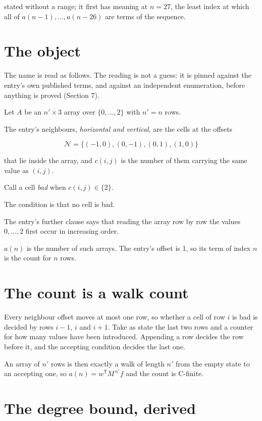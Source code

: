 \documentclass[11pt]{article}
\theoremstyle{definition}
\begin{document}
stated without a range; it first has meaning at $n = 27$, the least index at which all of $a(n-1),\dots,a(n-26)$ are terms of the sequence.

\section{The object}

The name is read as follows. The reading is not a guess: it is pinned against the entry's own published terms, and against an independent enumeration, before anything is proved (Section 7).

Let $A$ be an $n' \times 3$ array over $\{0,\dots,2\}$ with $n' = n$ rows.

The entry's neighbours, {\itshape horizontal and vertical}, are the cells at the offsets

\[\mathcal{N} = \{(-1,0), (0,-1), (0,1), (1,0)\}\]

that lie inside the array, and $c(i,j)$ is the number of them carrying the same value as $(i,j)$.

Call a cell {\itshape bad} when $c(i,j) \in \{2\}$.

The condition is that no cell is bad.

The entry's further clause says that reading the array row by row the values $0,\dots,2$ first occur in increasing order.

$a(n)$ is the number of such arrays. The entry's offset is 1, so its term of index $n$ is the count for $n$ rows.

\section{The count is a walk count}

Every neighbour offset moves at most one row, so whether a cell of row $i$ is bad is decided by rows $i-1$, $i$ and $i+1$. Take as state the last two rows and a counter for how many values have been introduced. Appending a row decides the row before it, and the accepting condition decides the last one.

An array of $n'$ rows is then exactly a walk of length $n'$ from the empty state to an accepting one, so $a(n) = w^{\mathsf T}M^{\,n'}f$ and the count is C-finite.

\section{The degree bound, derived}
\end{document}

